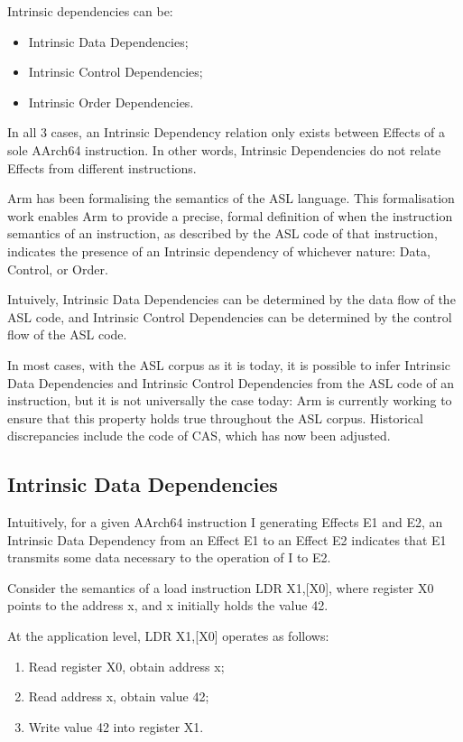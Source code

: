 \documentclass{book}
\begin{document}
Intrinsic dependencies can be: 
\begin{itemize}
\item Intrinsic Data Dependencies; 
\item Intrinsic Control Dependencies; 
\item Intrinsic Order Dependencies. 
\end{itemize}
 
In all 3 cases, an Intrinsic Dependency relation only
exists between Effects of a sole AArch64 instruction.
In other words, Intrinsic Dependencies do not relate
Effects from different instructions. 
 
Arm has been formalising the semantics of the ASL
language. This formalisation work enables Arm to
provide a precise, formal definition of when the
instruction semantics of an instruction, as described
by the ASL code of that instruction, indicates the
presence of an Intrinsic dependency of whichever
nature: Data, Control, or Order. 

Intuively, Intrinsic Data Dependencies can
be determined by the data flow of the ASL code, and
Intrinsic Control Dependencies can be
determined by the control flow of the ASL code.

In most cases, with the ASL corpus as it is today, it is possible to infer
Intrinsic Data Dependencies and Intrinsic Control Dependencies from the ASL
code of an instruction, but it is not universally the case today: Arm is
currently working to ensure that this property holds true throughout the ASL
corpus.  Historical discrepancies include the code of CAS, which has now been
adjusted. 

\subsection{Intrinsic Data Dependencies}
 
Intuitively, for a given AArch64 instruction I
generating Effects E1 and E2, an Intrinsic Data
Dependency from an Effect E1 to an Effect E2
indicates that E1 transmits some data necessary to
the operation of I to E2. 
 
Consider the semantics of a load instruction LDR
X1,[X0], where register X0 points to the address x,
and x initially holds the value 42. 

At the application level, LDR X1,[X0] operates as follows:

\begin{enumerate}
\item Read register X0, obtain address x; 
\item Read address x, obtain value 42; 
\item Write value 42 into register X1. 
\end{enumerate}
\end{document}
